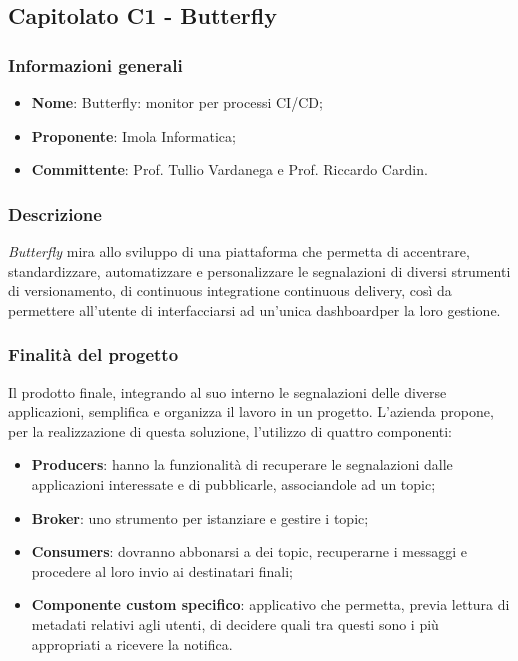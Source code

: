 \subsection{Capitolato C1 - Butterfly}
\subsubsection{Informazioni generali}
\begin{itemize}
\item
\textbf{Nome}: Butterfly: monitor per processi CI/CD;
\item
\textbf{Proponente}: Imola Informatica;
\item
\textbf{Committente}: Prof. Tullio Vardanega e Prof. Riccardo Cardin.
\end{itemize}
\subsubsection{Descrizione}
\textit{Butterfly} mira allo sviluppo di una piattaforma che permetta di
 accentrare, standardizzare, automatizzare e personalizzare le segnalazioni di diversi strumenti di versionamento, di continuous integration\glosp e continuous delivery\glo , così da permettere all'utente di interfacciarsi ad un'unica dashboard\glosp per la loro gestione.

\subsubsection{Finalità del progetto}
Il prodotto finale, integrando al suo interno le segnalazioni delle diverse 
applicazioni, semplifica e organizza il lavoro in un progetto. L'azienda propone,
per la realizzazione di questa soluzione, l'utilizzo di quattro componenti:
\begin{itemize}
	\item \textbf{Producers}: hanno la funzionalità di recuperare le segnalazioni dalle applicazioni interessate e di pubblicarle, associandole ad un topic;
	\item \textbf{Broker}: uno strumento per istanziare e gestire i topic;
	\item \textbf{Consumers}: dovranno abbonarsi a dei topic, recuperarne i messaggi e procedere al loro invio ai destinatari finali;
    \item \textbf{Componente custom specifico}: applicativo che permetta, previa lettura di metadati relativi agli utenti, di decidere quali tra questi sono i più appropriati a ricevere la notifica.
\end{itemize}
